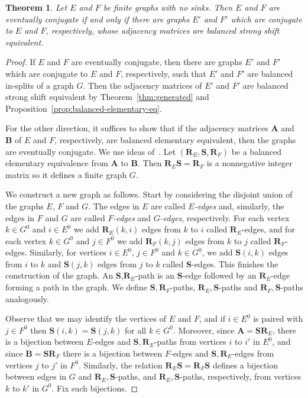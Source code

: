 \documentclass[12pt,a4paper,oneside,reqno,final]{amsart}
\newtheorem{theorem}[lemma]{Theorem}
\theoremstyle{definition}
\numberwithin{equation}{section} %
\begin{document}
\begin{theorem}\label{thm:balanced-strong-shift-equivalence}
    Let $E$ and $F$ be finite graphs with no sinks.
    Then $E$ and $F$ are eventually conjugate if and only if there are graphs $E'$ and $F'$ which are conjugate to $E$ and $F$, respectively,
    whose adjacency matrices are balanced strong shift equivalent.
\end{theorem}

\begin{proof}
    If $E$ and $F$ are eventually conjugate, then there are graphs $E'$ and $F'$ which are conjugate to $E$ and $F$, respectively,
    such that $E'$ and $F'$ are balanced in-splits of a graph $G$.
    Then the adjacency matrices of $E'$ and $F'$ are balanced strong shift equivalent by Theorem~\ref{thm:generated} and Proposition~\ref{prop:balanced-elementary-eq}.

    For the other direction, it suffices to show that if the adjacency matrices \textbf{A} and \textbf{B} of $E$ and $F$, respectively, are balanced elementary equivalent,
    then the graphs are eventually conjugate.
    We use ideas of~\cite[Section 7.2]{LM}.
    Let $(\textbf{R}_E, \textbf{S}, \textbf{R}_F)$ be a balanced elementary equivalence from \textbf{A} to \textbf{B}.
    Then $\textbf{R}_E \textbf{S} = \textbf{R}_F$ is a nonnegative integer matrix so it defines a finite graph $G$.
    
    We construct a new graph as follows.
    Start by considering the disjoint union of the graphs $E$, $F$ and $G$.
    The edges in $E$ are called \emph{$E$-edges} and, similarly, the edges in $F$ and $G$ are called \emph{$F$-edges} and \emph{$G$-edges}, respectively.
    For each vertex $k\in G^0$ and $i\in E^0$ we add $\textbf{R}_E(k, i)$ edges from $k$ to $i$ called $\textbf{R}_E$-edges,
    and for each vertex $k\in G^0$ and $j\in F^0$ we add $\textbf{R}_F(k, j)$ edges from $k$ to $j$ called $\textbf{R}_F$-edges.
    Similarly, for vertices $i\in E^0$, $j\in F^0$ and $k\in G^0$, we add $\textbf{S}(i,k)$ edges from $i$ to $k$ and $\textbf{S}(j,k)$ edges from $j$ to $k$ called \textbf{S}-edges.
    This finishes the construction of the graph.
    An \textbf{S},$\textbf{R}_E$-path is an \textbf{S}-edge followed by an $\textbf{R}_E$-edge forming a path in the graph.
    We define $\textbf{S}, \textbf{R}_F$-paths, $\textbf{R}_E, \textbf{S}$-paths and $\textbf{R}_F, \textbf{S}$-paths analogously.

    Observe that we may identify the vertices of $E$ and $F$, and if $i\in E^0$ is paired with $j\in F^0$ then $\textbf{S}(i,k) = \textbf{S}(j,k)$ for all $k\in G^0$.
    Moreover, since $\textbf{A} = \textbf{S} \textbf{R}_E$, there is a bijection between $E$-edges and $\textbf{S}, \textbf{R}_E$-paths from vertices $i$ to $i'$ in $E^0$,
    and since $\textbf{B} = \textbf{S} \textbf{R}_F$ there is a bijection between $F$-edges and $\textbf{S}, \textbf{R}_E$-edges from vertices $j$ to $j'$ in $F^0$.
    Similarly, the relation $\textbf{R}_E \textbf{S} = \textbf{R}_F \textbf{S}$ defines a bijection between edges in $G$ and $\textbf{R}_E, \textbf{S}$-paths,
    and $\textbf{R}_E, \textbf{S}$-paths, respectively, from vertices $k$ to $k'$ in $G^0$.
    Fix such bijections.


\end{proof}
\end{document}

